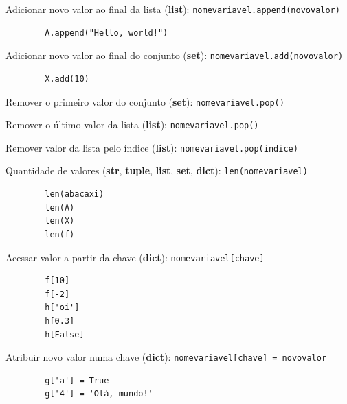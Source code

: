 \begin{frame}[containsverbatim]
	Adicionar novo valor ao final da lista 
	(\textbf{list}):
	\texttt{nomevariavel.append(novovalor)}	
	
	\begin{verbatim}
		A.append("Hello, world!") 	
	\end{verbatim}
\end{frame}

\begin{frame}[containsverbatim]
	Adicionar novo valor ao final do conjunto 
	(\textbf{set}):
	\texttt{nomevariavel.add(novovalor)}	
	
	\begin{verbatim}
		X.add(10) 	
	\end{verbatim}
	
\end{frame}

\begin{frame}[containsverbatim]
	Remover o primeiro valor do conjunto 
	(\textbf{set}):
	\texttt{nomevariavel.pop()}	
\end{frame}

\begin{frame}[containsverbatim]
	Remover o último valor da lista 
	(\textbf{list}):
	\texttt{nomevariavel.pop()}	
	
	Remover valor da lista pelo índice
	(\textbf{list}):
	\texttt{nomevariavel.pop(indice)}	
\end{frame}

\begin{frame}[containsverbatim]
	Quantidade de valores 
	(\textbf{str}, \textbf{tuple}, \textbf{list}, \textbf{set}, \textbf{dict}):
	\texttt{len(nomevariavel)}
	
	\begin{verbatim}
		len(abacaxi)
		len(A)
		len(X)
		len(f) 	
	\end{verbatim}
\end{frame}

\begin{frame}[containsverbatim]
	Acessar valor a partir da chave 
	(\textbf{dict}):
	\texttt{nomevariavel[chave]}
	
	\begin{verbatim}
		f[10]
		f[-2]
		h['oi']
		h[0.3]
		h[False]
	\end{verbatim}
\end{frame}

\begin{frame}[containsverbatim]
	Atribuir novo valor numa chave 
	(\textbf{dict}):
	\texttt{nomevariavel[chave] = novovalor}
	
	\begin{verbatim}
		g['a'] = True
		g['4'] = 'Olá, mundo!'
	\end{verbatim}	
	
\end{frame}

